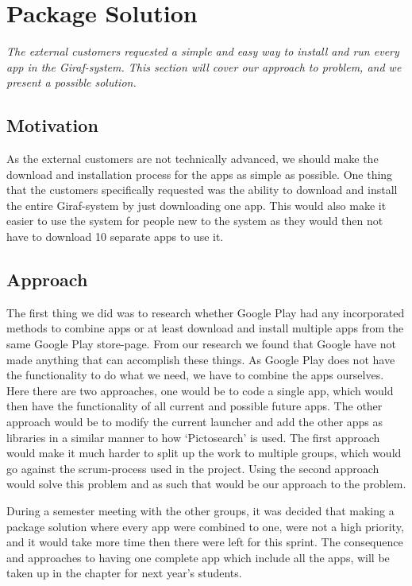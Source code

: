 \section{Package Solution} \label{Sprint4_PackageSolution}
\textit{The external customers requested a simple and easy way to install and run every app in the Giraf-system. This section will cover our approach to problem, and we present a possible solution.}

\subsection{Motivation}
As the external customers are not technically advanced, we should make the download and installation process for the apps as simple as possible. One thing that the customers specifically requested was the ability to download and install the entire Giraf-system by just downloading one app. This would also make it easier to use the system for people new to the system as they would then not have to download 10 separate apps to use it.

\subsection{Approach}
The first thing we did was to research whether Google Play had any incorporated methods to combine apps or at least download and install multiple apps from the same Google Play store-page. From our research we found that Google have not made anything that can accomplish these things.
As Google Play does not have the functionality to do what we need, we have to combine the apps ourselves. Here there are two approaches, one would be to code a single app, which would then have the functionality of all current and possible future apps. The other approach would be to modify the current launcher and add the other apps as libraries in a similar manner to how ‘Pictosearch’ is used.
The first approach would make it much harder to split up the work to multiple groups, which would go against the scrum-process used in the project. Using the second approach would solve this problem and as such that would be our approach to the problem.


During a semester meeting with the other groups, it was decided that making a package solution where every app were combined to one, were not a high priority, and it would take more time then there were left for this sprint. The consequence and approaches to having one complete app which include all the apps, will be taken up in the chapter for next year's students.